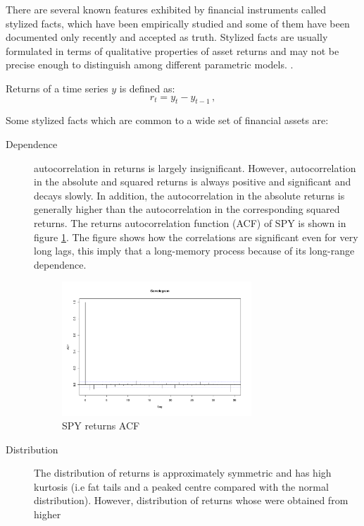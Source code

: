 There are several known features exhibited by financial instruments called
stylized facts, which have been empirically studied and some of them have been
documented only recently and accepted as truth. Stylized facts are usually
formulated in terms of qualitative properties of asset returns and may not be
precise enough to distinguish among different parametric models.
\cite{cont2001}.

Returns of a time series $y$ is defined as:
\begin{equation}
\label{eq:returndef}
r_t = y_t - y_{t-1}  \, ,
\end{equation}

Some stylized facts which are common to a wide set of financial assets
\cite{sewell2011} are:

\begin{description}
\item[Dependence] autocorrelation in returns is largely insignificant. However,
autocorrelation in the absolute and squared returns is always positive and
significant and decays slowly. In addition, the autocorrelation in the absolute
returns is generally higher than the autocorrelation in the corresponding
squared returns. The returns autocorrelation function (ACF) of SPY is shown in figure
 \ref{fig:returnacf}. The figure shows how the correlations are significant even
 for very long lags, this imply that a long-memory process because of its
 long-range dependence. 
 \begin{figure}[h]
 \centering
 \includegraphics[width=0.7\textwidth]{plots/spy_returns_acf.pdf}
 \caption{SPY returns ACF}
 \label{fig:returnacf}
\end{figure}
\item[Distribution] The distribution of returns is approximately symmetric and
has high kurtosis (i.e fat tails and a peaked centre compared with the normal
distribution). However, distribution of returns whose were obtained from higher

\end{description}
